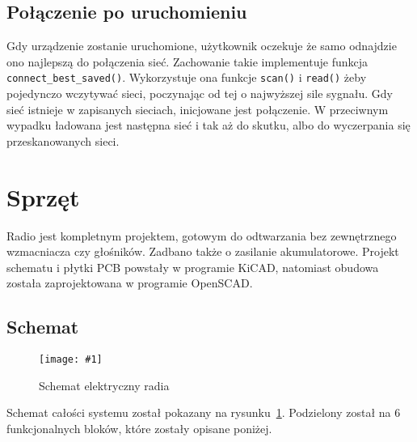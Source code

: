 \documentclass[polish]{aghengthesis}
\newcommand{\imgint}[4]{
	\begin{figure}[{#4}]
		\centering
		\texttt{[image: \#1]}
		\caption{#2}
		\label{#1}
	\end{figure}
}
\newcommand{\imgh}[3]{\imgint{#1}{#2}{#3}{H}}
\begin{document}
		\subsection{Połączenie po uruchomieniu}
			Gdy urządzenie zostanie uruchomione, użytkownik oczekuje że samo odnajdzie ono najlepszą do połączenia sieć. Zachowanie takie implementuje funkcja \lstinline|connect_best_saved()|. Wykorzystuje ona funkcje \lstinline|scan()| i \lstinline|read()| żeby pojedynczo wczytywać sieci, poczynając od tej o najwyższej sile sygnału. Gdy sieć istnieje w zapisanych sieciach, inicjowane jest połączenie. W przeciwnym wypadku ładowana jest następna sieć i tak aż do skutku, albo do wyczerpania się przeskanowanych sieci.
		
	\section{Sprzęt}
		\label{sec:hw}
		Radio jest kompletnym projektem, gotowym do odtwarzania bez zewnętrznego wzmacniacza czy głośników. Zadbano także o zasilanie akumulatorowe. Projekt schematu i płytki PCB powstały w programie KiCAD\textsuperscript{\cite{hw_kicad}}, natomiast obudowa została zaprojektowana w programie OpenSCAD\textsuperscript{\cite{hw_openscad}}.
	
		\subsection{Schemat}
			\imgh{3/hw_kicad_sch}{Schemat elektryczny radia}{1}
			
			Schemat całości systemu został pokazany na rysunku~\ref{3/hw_kicad_sch}. Podzielony został na 6 funkcjonalnych bloków, które zostały opisane poniżej.
			
\end{document}
